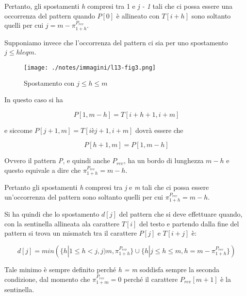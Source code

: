 Pertanto, gli spostamenti \textit{h} compresi tra 1 e \textit{j - 1} tali che ci possa essere una occorrenza del pattern quando $ P[0] $ è allineato con $ T[i+h] $ sono soltanto quelli per cui $ j = m - \pi_{1+h}^{P_{rev}} $.

Supponiamo invece che l'occorrenza del pattern ci sia per uno spostamento $ j \leq h leq m $.

\begin{figure}[htbp]
	\centering
	\texttt{[image: ./notes/immagini/l13-fig3.png]}
	\caption{Spostamento con $ j \leq h \leq m $}
\end{figure}

In questo caso si ha 

$$
P[1,m-h] = T[i+h +1, i+m]
$$

e siccome $ P[j+1,m] = T[ièj+1,i+m] $ dovrà essere che

$$
P[h+1,m] = P[1,m-h]
$$

Ovvero il pattern \textit{P}, e quindi anche $ P_{rev} $, ha un bordo di lunghezza $ m-h $ e questo equivale a dire che $ \pi_{1+h}^{P_{rev}} = m-h $.

Pertanto gli spostamenti \textit{h} compresi tra \textit{j} e \textit{m} tali che ci possa essere un'occorrenza del pattern sono soltanto quelli per cui $ \pi_{1+h}^{P_{rev}}  = m-h $.

Si ha quindi che lo spostamento $d[j]$ del pattern che si deve effettuare quando, con la sentinella allineata ala carattere $ T[i] $ del testo e partendo dalla fine del pattern si trova un mismatch tra il carattere $ P[j] $ e $ T[i+j] $ è:

$$
d[j] = min(\{h | 1 \leq h < j, j ) m , \pi_{1+h}^{P_{rev}}\} \cup \{h | j \leq h \leq m, h = m - \pi_{1+h}^{P_{rev}}\})
$$

Tale minimo è sempre definito perché \emph{h = m} soddisfa sempre la seconda condizione, dal momento che $ \pi_{1+m}^{P_{rev}}  = 0$ perché il carattere $ P_{rev}[m+1] $ è la sentinella.
